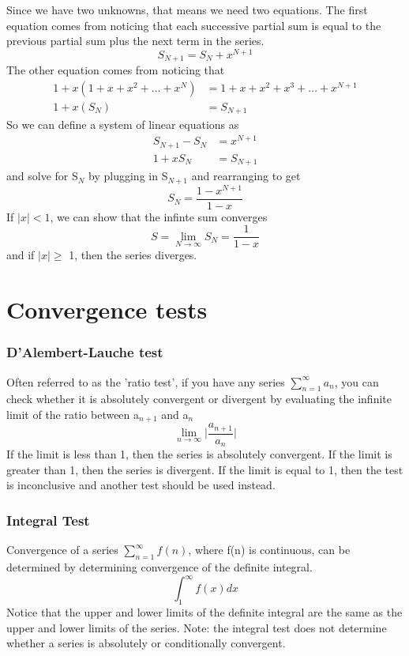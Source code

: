 \documentclass{article}
\newcommand{\be}{\begin{equation}}
\newcommand{\ee}{\end{equation}}
\begin{document}
Since we have two unknowns, that means we need two equations.
The first equation comes from noticing that each successive partial sum is equal to the previous partial sum plus the next term in the series.
\be
S_{N+1} = S_N + x^{N+1}
\ee
The other equation comes from noticing that
\be
\begin{split}
1 + x(1 + x + x^2 + \hdots + x^N) &= 1 + x + x^2 + x^3 + \hdots + x^{N+1} \\
1 + x (S_N) &= S_{N+1}
\end{split}
\ee
So we can define a system of linear equations as
\be
\begin{split}
S_{N+1} - S_N &= x^{N+1} \\
1 + xS_N &= S_{N+1}
\end{split}
\ee
and solve for S$_N$ by plugging in S$_{N+1}$ and rearranging to get
\be
S_N = \frac{1-x^{N+1}}{1-x}
\ee
If $|x| < 1$, we can show that the infinte sum converges
\be
S = \lim_{N \to \infty}S_N = \frac{1}{1-x}
\ee
and if $|x|\geq$ 1, then the series diverges.
\section*{Convergence tests}
\subsubsection*{D'Alembert-Lauche test}
Often referred to as the 'ratio test', if you have any series $\sum\limits_{n=1}^{\infty} a_n$, you can check whether it is absolutely convergent or divergent by evaluating the infinite limit of the ratio between a$_{n+1}$ and a$_n$
\be
\lim_{n \to \infty} \Big| \frac{a_{n+1}}{a_n} \Big|
\ee
If the limit is less than 1, then the series is absolutely convergent.
If the limit is greater than 1, then the series is divergent.
If the limit is equal to 1, then the test is inconclusive and another test should be used instead.
\subsubsection*{Integral Test}
Convergence of a series $\sum\limits_{n=1}^{\infty} f(n)$, where f(n) is continuous, can be determined by determining convergence of the definite integral.
\be
\int_{1}^{\infty}f(x)dx
\ee
Notice that the upper and lower limits of the definite integral are the same as the upper and lower limits of the series.
Note: the integral test does not determine whether a series is absolutely or conditionally convergent.
\end{document}
